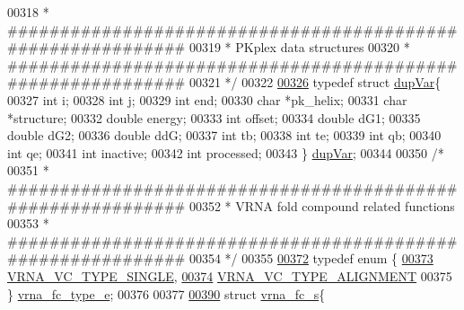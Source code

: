 \begin{DoxyCode}
00318 \textcolor{comment}{* ############################################################}
00319 \textcolor{comment}{* PKplex data structures}
00320 \textcolor{comment}{* ############################################################}
00321 \textcolor{comment}{*/}
00322 
\hypertarget{data__structures_8h_source_l00326}{}\hyperlink{group__data__structures}{00326} \textcolor{keyword}{typedef} \textcolor{keyword}{struct }\hyperlink{group__data__structures_structdupVar}{dupVar}\{
00327   \textcolor{keywordtype}{int} i;
00328   \textcolor{keywordtype}{int} j;
00329   \textcolor{keywordtype}{int} end;
00330   \textcolor{keywordtype}{char} *pk\_helix;
00331   \textcolor{keywordtype}{char} *structure;
00332   \textcolor{keywordtype}{double} energy;
00333   \textcolor{keywordtype}{int} offset;
00334   \textcolor{keywordtype}{double} dG1;
00335   \textcolor{keywordtype}{double} dG2;
00336   \textcolor{keywordtype}{double} ddG;
00337   \textcolor{keywordtype}{int} tb;
00338   \textcolor{keywordtype}{int} te;
00339   \textcolor{keywordtype}{int} qb;
00340   \textcolor{keywordtype}{int} qe;
00341   \textcolor{keywordtype}{int} inactive;
00342   \textcolor{keywordtype}{int} processed;
00343 \} \hyperlink{group__data__structures_structdupVar}{dupVar};
00344 
00350 \textcolor{comment}{/*}
00351 \textcolor{comment}{* ############################################################}
00352 \textcolor{comment}{* VRNA fold compound related functions}
00353 \textcolor{comment}{* ############################################################}
00354 \textcolor{comment}{*/}
00355 
\hypertarget{data__structures_8h_source_l00372}{}\hyperlink{group__fold__compound_ga01a4ff86fa71deaaa5d1abbd95a1447d}{00372} \textcolor{keyword}{typedef} \textcolor{keyword}{enum} \{
\hypertarget{data__structures_8h_source_l00373}{}\hyperlink{group__fold__compound_gga01a4ff86fa71deaaa5d1abbd95a1447da1608d3aa78905fc39e0d25a624ac9512}{00373}   \hyperlink{group__fold__compound_gga01a4ff86fa71deaaa5d1abbd95a1447da1608d3aa78905fc39e0d25a624ac9512}{VRNA\_VC\_TYPE\_SINGLE},    
\hypertarget{data__structures_8h_source_l00374}{}\hyperlink{group__fold__compound_gga01a4ff86fa71deaaa5d1abbd95a1447da056345f1bcfe7cd595d1fd437c05246d}{00374}   \hyperlink{group__fold__compound_gga01a4ff86fa71deaaa5d1abbd95a1447da056345f1bcfe7cd595d1fd437c05246d}{VRNA\_VC\_TYPE\_ALIGNMENT}  
00375 \} \hyperlink{group__fold__compound_ga01a4ff86fa71deaaa5d1abbd95a1447d}{vrna\_fc\_type\_e};
00376 
00377 
\hypertarget{data__structures_8h_source_l00390}{}\hyperlink{group__fold__compound}{00390} \textcolor{keyword}{struct }\hyperlink{group__fold__compound_structvrna__fc__s}{vrna\_fc\_s}\{

\end{DoxyCode}
